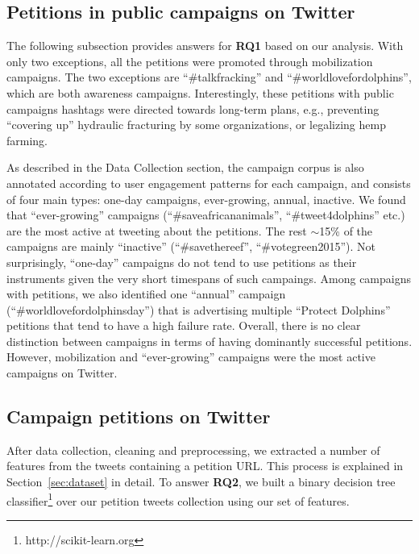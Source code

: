 \subsection{Petitions in public campaigns on Twitter}

The following subsection provides answers for \textbf{RQ1} based on our analysis.
With only two exceptions, all the petitions were promoted through mobilization campaigns. The two exceptions are ``\#talkfracking'' and ``\#worldlovefordolphins'', which are both awareness campaigns.
Interestingly, these petitions with public campaigns hashtags were directed towards long-term plans, e.g., preventing ``covering up'' hydraulic fracturing by some organizations, or legalizing hemp farming.

As described in the Data Collection section, the campaign corpus is also annotated according to user engagement patterns for each campaign, and consists of four main types: one-day campaigns, ever-growing, annual, inactive.
We found that ``ever-growing'' campaigns (``\#saveafricananimals'', ``\#tweet4dolphins'' etc.) are the most active at tweeting about the petitions.
The rest $\sim$15\% of the campaigns are mainly ``inactive'' (``\#savethereef'', ``\#votegreen2015'').
Not surprisingly, ``one-day'' campaigns do not tend to use petitions as their instruments given the very short timespans of such campaings.
Among campaigns with petitions, we also identified one ``annual'' campaign (``\#worldlovefordolphinsday'') that is advertising multiple ``Protect Dolphins'' petitions that tend to have a high failure rate.
Overall, there is no clear distinction between campaigns in terms of having dominantly successful petitions.
However, mobilization and ``ever-growing'' campaigns were the most active campaigns on Twitter.

\subsection{Campaign petitions on Twitter}
After data collection, cleaning and preprocessing, we extracted a number of features from the tweets containing a petition URL.
This process is explained in Section~\ref{sec:dataset} in detail.
To answer \textbf{RQ2}, we built a binary decision tree classifier\footnote{ http://scikit-learn.org } over our petition tweets collection using our set of features.

